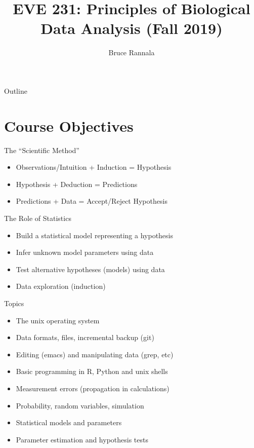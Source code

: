 \documentclass[xetex]{beamer}
\author{Bruce Rannala}
\date{}
\title{EVE 231: Principles of Biological Data Analysis (Fall 2019)}
\begin{document}
\maketitle
\begin{frame}{Outline}
\tableofcontents
\end{frame}


\section{Course Objectives}
\label{sec:org050477c}
\begin{frame}[label={sec:org72b74ca}]{The ``Scientific Method''}
\begin{itemize}
\item Observations/Intuition + Induction = Hypothesis
\item Hypothesis + Deduction = Predictions
\item Predictions + Data = Accept/Reject Hypothesis
\end{itemize}
\end{frame}
\begin{frame}[label={sec:org0bdfb46}]{The Role of Statistics}
\begin{itemize}
\item Build a statistical model representing a hypothesis
\item Infer unknown model parameters using data
\item Test alternative hypotheses (models) using data
\item Data exploration (induction)
\end{itemize}
\end{frame}
\begin{frame}[label={sec:orgbef5d61}]{Topics}
\begin{itemize}
\item The unix operating system
\item Data formats, files, incremental backup (git)
\item Editing (emacs) and manipulating data (grep, etc)
\item Basic programming in R, Python and unix shells
\item Measurement errors (propagation in calculations)
\item Probability, random variables, simulation
\item Statistical models and parameters
\item Parameter estimation and hypothesis tests
\end{itemize}
\end{frame}
\end{document}
